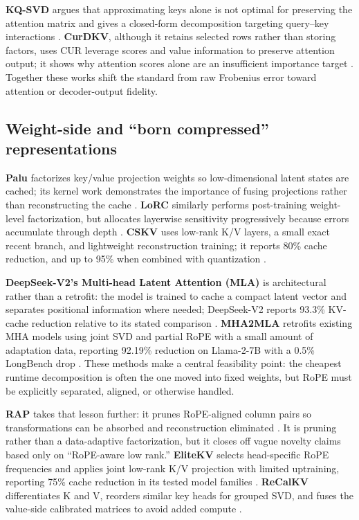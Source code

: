 \documentclass[10pt]{article}
\begin{document}
\textbf{KQ-SVD} argues that approximating keys alone is not optimal for preserving the attention
matrix and gives a closed-form decomposition targeting query--key interactions \cite{kqsvd}.
\textbf{CurDKV}, although it retains selected rows rather than storing factors, uses CUR leverage
scores and value information to preserve attention output; it shows why attention scores alone are
an insufficient importance target \cite{curdkv}. Together these works shift the standard from raw
Frobenius error toward attention or decoder-output fidelity.

\subsection{Weight-side and ``born compressed'' representations}

\textbf{Palu} factorizes key/value projection weights so low-dimensional latent states are cached;
its kernel work demonstrates the importance of fusing projections rather than reconstructing the
cache \cite{palu}. \textbf{LoRC} similarly performs post-training weight-level factorization, but
allocates layerwise sensitivity progressively because errors accumulate through depth
\cite{lorc}. \textbf{CSKV} uses low-rank K/V layers, a small exact recent branch, and lightweight
reconstruction training; it reports 80\% cache reduction, and up to 95\% when combined with
quantization \cite{cskv}.

\textbf{DeepSeek-V2's Multi-head Latent Attention (MLA)} is architectural rather than a retrofit:
the model is trained to cache a compact latent vector and separates positional information where
needed; DeepSeek-V2 reports 93.3\% KV-cache reduction relative to its stated comparison
\cite{mla}. \textbf{MHA2MLA} retrofits existing MHA models using joint SVD and partial RoPE with a
small amount of adaptation data, reporting 92.19\% reduction on Llama-2-7B with a 0.5\% LongBench
drop \cite{mha2mla}. These methods make a central feasibility point: the cheapest runtime
decomposition is often the one moved into fixed weights, but RoPE must be explicitly separated,
aligned, or otherwise handled.

\textbf{RAP} takes that lesson further: it prunes RoPE-aligned column pairs so transformations can
be absorbed and reconstruction eliminated \cite{rap}. It is pruning rather than a data-adaptive
factorization, but it closes off vague novelty claims based only on ``RoPE-aware low rank.''
\textbf{EliteKV} selects head-specific RoPE frequencies and applies joint low-rank K/V projection
with limited uptraining, reporting 75\% cache reduction in its tested model families
\cite{elitekv}.
\textbf{ReCalKV} differentiates K and V, reorders similar key heads for grouped SVD, and fuses the
value-side calibrated matrices to avoid added compute \cite{recalkv}.
\end{document}
